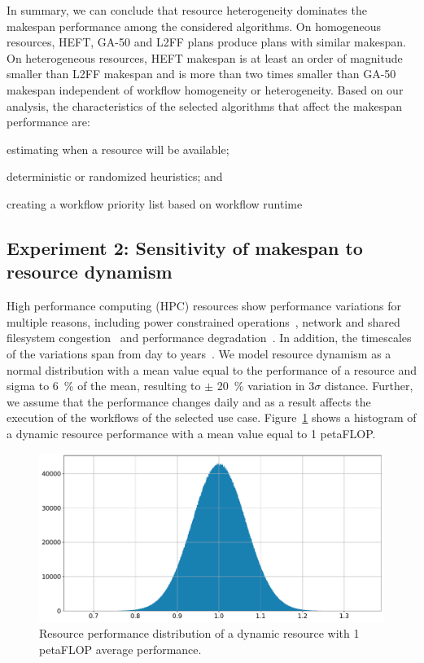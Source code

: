 In summary, we can conclude that resource heterogeneity dominates the makespan performance among the considered algorithms.
On homogeneous resources, HEFT, GA-50 and L2FF plans produce plans with similar makespan.
On heterogeneous resources, HEFT makespan is at least an order of magnitude smaller than L2FF makespan and is more than two times smaller than GA-50 makespan independent of workflow homogeneity or heterogeneity.
Based on our analysis, the characteristics of the selected algorithms that affect the makespan performance are:
\begin{inparaenum}[1)]
    \item estimating when a resource will be available;
    \item deterministic or randomized heuristics; and
    \item creating a workflow priority list based on workflow runtime
\end{inparaenum}

\subsection{Experiment 2: Sensitivity of makespan to resource dynamism}

High performance computing (HPC) resources show performance variations for multiple reasons, including power constrained operations~\cite{inadomi2015analyzing}, network and shared filesystem congestion~\cite{brown2018interference} and performance degradation~\cite{wu2017survey}.
In addition, the timescales of the variations span from day to years~\cite{skinner2005understanding}.
We model resource dynamism as a normal distribution with a mean value equal to the performance of a resource and sigma to 6~\% of the mean, resulting to $\pm$ 20~\% variation in $3\sigma$ distance.
Further, we assume that the performance changes daily and as a result affects the execution of the workflows of the selected use case.
Figure~\ref{fig:dynamic_res} shows a histogram of a dynamic resource performance with a mean value equal to 1 petaFLOP.

\begin{figure}[ht!]
    \centering
    \includegraphics[width=.95\textwidth]{figures/campaign/DynRes.pdf}
    \caption{Resource performance distribution of a dynamic resource with 1 petaFLOP average performance.}
    \label{fig:dynamic_res}
\end{figure}

